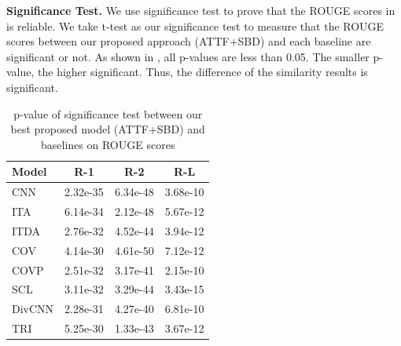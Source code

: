 \textbf{Significance Test.} We use significance test to prove that the ROUGE scores in  is reliable.
We take t-test 
\citep{loukina2014automatic,albert2017exploring}
as our significance test to
measure that the ROUGE scores between our proposed approach (ATTF+SBD) and each baseline are significant or not. 
As shown in ,
all p-values are less than 0.05. 
The smaller p-value, the higher significant.
Thus, the difference of the similarity results is significant. 
\begin{table}[th!]
	\begin{center}
		\caption{p-value of significance test between 
			our best proposed model (ATTF+SBD) and baselines on ROUGE scores}
		\begin{tabular}{|l|c|c|c|}
			\hline
			Model &   R-1 & R-2 & R-L \\
			\hline
			CNN &  2.32e-35 & 6.34e-48 & 3.68e-10 \\
			ITA &  6.14e-34 & 2.12e-48 & 5.67e-12 \\
			ITDA & 2.76e-32 & 4.52e-44 & 3.94e-12 \\
			COV	& 4.14e-30 & 4.61e-50 & 7.12e-12 \\
			COVP & 2.51e-32 & 3.17e-41 & 2.15e-10 \\
			SCL	& 3.11e-32 & 3.29e-44 & 3.43e-15 \\
			DivCNN	& 2.28e-31 & 4.27e-40 & 6.81e-10 \\
			TRI & 5.25e-30 & 1.33e-43 & 3.67e-12 \\
			\hline
		\end{tabular}
		\label{tab:ttest}
	\end{center}
\end{table}

